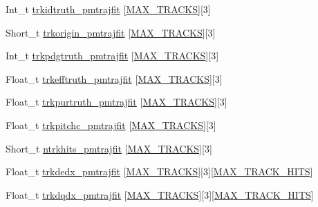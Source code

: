 \begin{DoxyCompactItemize}
\item 
Int\-\_\-t \hyperlink{classanatree_a15ca95c148917641a77bb2a425aa1fcd}{trkidtruth\-\_\-pmtrajfit} \mbox{[}\hyperlink{anatree__core__v09410002__orig_8h_a327fd4e796e4a0d78947524c96e4362e}{M\-A\-X\-\_\-\-T\-R\-A\-C\-K\-S}\mbox{]}\mbox{[}3\mbox{]}
\item 
Short\-\_\-t \hyperlink{classanatree_a9cfd1951a32ba252337ce500104ae6cc}{trkorigin\-\_\-pmtrajfit} \mbox{[}\hyperlink{anatree__core__v09410002__orig_8h_a327fd4e796e4a0d78947524c96e4362e}{M\-A\-X\-\_\-\-T\-R\-A\-C\-K\-S}\mbox{]}\mbox{[}3\mbox{]}
\item 
Int\-\_\-t \hyperlink{classanatree_a612ea721fc3c57404dd6b15a4b0b6f76}{trkpdgtruth\-\_\-pmtrajfit} \mbox{[}\hyperlink{anatree__core__v09410002__orig_8h_a327fd4e796e4a0d78947524c96e4362e}{M\-A\-X\-\_\-\-T\-R\-A\-C\-K\-S}\mbox{]}\mbox{[}3\mbox{]}
\item 
Float\-\_\-t \hyperlink{classanatree_a43587625e0267ff4e395f1856996abd5}{trkefftruth\-\_\-pmtrajfit} \mbox{[}\hyperlink{anatree__core__v09410002__orig_8h_a327fd4e796e4a0d78947524c96e4362e}{M\-A\-X\-\_\-\-T\-R\-A\-C\-K\-S}\mbox{]}\mbox{[}3\mbox{]}
\item 
Float\-\_\-t \hyperlink{classanatree_acfc40e8430e7b9cdd1f23e44029897c9}{trkpurtruth\-\_\-pmtrajfit} \mbox{[}\hyperlink{anatree__core__v09410002__orig_8h_a327fd4e796e4a0d78947524c96e4362e}{M\-A\-X\-\_\-\-T\-R\-A\-C\-K\-S}\mbox{]}\mbox{[}3\mbox{]}
\item 
Float\-\_\-t \hyperlink{classanatree_a72abc2ae37be9e5f08f59588515e4453}{trkpitchc\-\_\-pmtrajfit} \mbox{[}\hyperlink{anatree__core__v09410002__orig_8h_a327fd4e796e4a0d78947524c96e4362e}{M\-A\-X\-\_\-\-T\-R\-A\-C\-K\-S}\mbox{]}\mbox{[}3\mbox{]}
\item 
Short\-\_\-t \hyperlink{classanatree_a14cddd686ef1522843822efe5bf97f59}{ntrkhits\-\_\-pmtrajfit} \mbox{[}\hyperlink{anatree__core__v09410002__orig_8h_a327fd4e796e4a0d78947524c96e4362e}{M\-A\-X\-\_\-\-T\-R\-A\-C\-K\-S}\mbox{]}\mbox{[}3\mbox{]}
\item 
Float\-\_\-t \hyperlink{classanatree_a0cc5a69f4fbc0a37f485ebc28bbbcc80}{trkdedx\-\_\-pmtrajfit} \mbox{[}\hyperlink{anatree__core__v09410002__orig_8h_a327fd4e796e4a0d78947524c96e4362e}{M\-A\-X\-\_\-\-T\-R\-A\-C\-K\-S}\mbox{]}\mbox{[}3\mbox{]}\mbox{[}\hyperlink{anatree__core__v09410002__orig_8h_ae75eb9050f16aa034339f05572523070}{M\-A\-X\-\_\-\-T\-R\-A\-C\-K\-\_\-\-H\-I\-T\-S}\mbox{]}
\item 
Float\-\_\-t \hyperlink{classanatree_a187b98e01b9145aaed5c8b07246d979b}{trkdqdx\-\_\-pmtrajfit} \mbox{[}\hyperlink{anatree__core__v09410002__orig_8h_a327fd4e796e4a0d78947524c96e4362e}{M\-A\-X\-\_\-\-T\-R\-A\-C\-K\-S}\mbox{]}\mbox{[}3\mbox{]}\mbox{[}\hyperlink{anatree__core__v09410002__orig_8h_ae75eb9050f16aa034339f05572523070}{M\-A\-X\-\_\-\-T\-R\-A\-C\-K\-\_\-\-H\-I\-T\-S}\mbox{]}

\end{DoxyCompactItemize}
